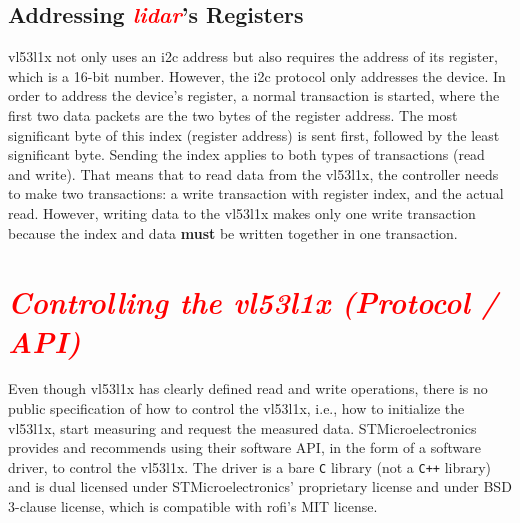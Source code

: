 \documentclass[
  digital,     %
  oneside,     %
  nosansbold,  %
  nocolorbold, %
  nolof,         %
  nolot,         %
]{fithesis4}
\newcommand{\TODO}[1]{\textcolor{red}{\textit{#1}}}
\newcommand{\TODOLIST}[1]{}
\begin{document}
{{{\subsection[ Addressing LiDAR's Registers ]{ Addressing \TODO{\acrshort{lidar}}'s Registers } \label{sec:lidar-i2c} 
\gls{vl53l1x} not only uses an \acrshort{i2c} address but also requires the address of its register, which is a 16-bit number. However, the \acrshort{i2c} protocol only addresses the device. In order to address the device's register, a normal transaction is started, where the first two data packets are the two bytes of the register address. The most significant byte of this index (register address) is sent first, followed by the least significant byte. Sending the index applies to both types of transactions (read and write). That means that to read data from the \gls{vl53l1x}, the controller needs to make two transactions: a write transaction with register index, and the actual read. However, writing data to the \gls{vl53l1x} makes only one write transaction because the index and data \textbf{must} be written together in one transaction.



\section[ Controlling the VL53L1X ]{ \TODO{ Controlling the \gls{vl53l1x} (Protocol / API)} }
Even though \gls{vl53l1x} has clearly defined read and write operations, there is no public specification of how to control the \gls{vl53l1x}, i.e., how to initialize the \gls{vl53l1x}, start measuring and request the measured data. STMicroelectronics provides and recommends using their software API, in the form of a software driver, to control the \gls{vl53l1x}. The driver is a bare \verb|C| library (not a \verb|C++| library) and is dual licensed under STMicroelectronics' proprietary license and under BSD 3-clause license, which is compatible with \acrshort{rofi}'s MIT license.

}}}
\end{document}
